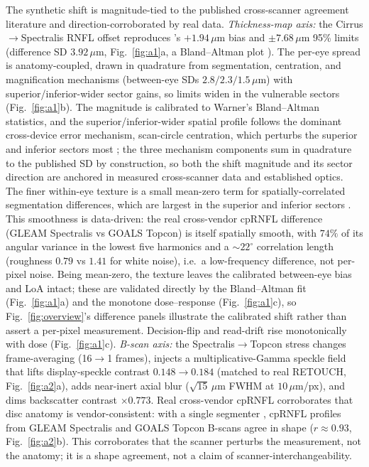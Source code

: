 The synthetic shift is magnitude-tied to the published cross-scanner agreement literature and direction-corroborated
by real data. \emph{Thickness-map axis:} the Cirrus$\rightarrow$Spectralis RNFL offset reproduces
\citet{warner2011loa}'s $+1.94\,\mu$m bias and $\pm7.68\,\mu$m 95\% limits (difference SD $3.92\,\mu$m,
Fig.~\ref{fig:a1}a, a Bland--Altman plot \citep{blandaltman1986}). The per-eye spread is anatomy-coupled, drawn in
quadrature from segmentation, centration, and magnification mechanisms (between-eye SDs $2.8/2.3/1.5\,\mu$m) with
superior/inferior-wider sector gains, so limits widen in the vulnerable sectors (Fig.~\ref{fig:a1}b). The magnitude
is calibrated to Warner's Bland--Altman statistics, and the superior/inferior-wider spatial profile follows the
dominant cross-device error mechanism, scan-circle centration, which perturbs the superior and inferior sectors most
\citep{cheung2009scancircle}; the three mechanism components sum in quadrature to the published SD by construction,
so both the shift magnitude and its sector direction are anchored in measured cross-scanner data and established
optics. The finer within-eye texture is a small mean-zero term for spatially-correlated segmentation differences, which
are largest in the superior and inferior sectors \citep{mansberger2017segerrors}. This smoothness is data-driven: the real cross-vendor cpRNFL difference
(GLEAM Spectralis vs GOALS Topcon) is itself spatially smooth, with $74\%$ of its angular variance
in the lowest five harmonics and a $\sim$$22^{\circ}$ correlation length (roughness $0.79$ vs $1.41$ for white
noise), i.e.\ a low-frequency difference, not per-pixel noise. Being mean-zero, the texture leaves the calibrated
between-eye bias and LoA intact; these are validated directly by the Bland--Altman fit (Fig.~\ref{fig:a1}a) and the
monotone dose--response (Fig.~\ref{fig:a1}c), so Fig.~\ref{fig:overview}'s difference panels illustrate the
calibrated shift rather than assert a per-pixel measurement. Decision-flip and read-drift rise monotonically with dose (Fig.~\ref{fig:a1}c). \emph{B-scan axis:} the
Spectralis$\rightarrow$Topcon stress changes frame-averaging (16$\rightarrow$1 frames), injects a
multiplicative-Gamma speckle field that lifts display-speckle contrast $0.148\rightarrow0.184$ (matched to real
RETOUCH, Fig.~\ref{fig:a2}a), adds near-inert axial blur ($\sqrt{15}\,\mu$m FWHM at $10\,\mu$m/px), and dims
backscatter contrast $\times0.773$. Real cross-vendor cpRNFL corroborates that disc anatomy is vendor-consistent:
with a single segmenter \citep{driessen2024}, cpRNFL profiles from GLEAM Spectralis and GOALS Topcon
\citep{goals2022} B-scans agree in shape ($r\approx0.93$, Fig.~\ref{fig:a2}b). This corroborates that the scanner
perturbs the measurement, not the anatomy; it is a shape agreement, not a claim of scanner-interchangeability.

